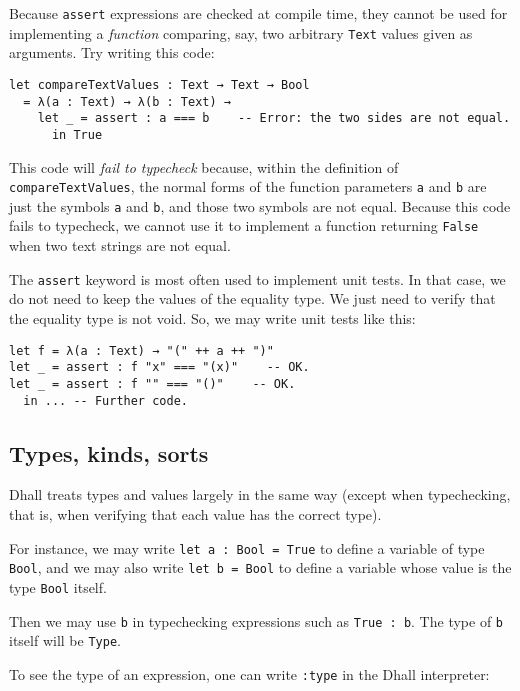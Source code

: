 Because \lstinline!assert! expressions are checked at compile time, they cannot be used for implementing a \emph{function} comparing, say, two arbitrary \lstinline!Text! values given as arguments.
Try writing this code:


\begin{lstlisting}[language=Dhall]
let compareTextValues : Text → Text → Bool
  = λ(a : Text) → λ(b : Text) → 
    let _ = assert : a === b    -- Error: the two sides are not equal.
      in True
\end{lstlisting}


This code will \emph{fail to typecheck} because, within the definition of \lstinline!compareTextValues!, the normal forms of the function parameters \lstinline!a! and \lstinline!b! are just the symbols \lstinline!a! and \lstinline!b!, and those two symbols are not equal.
Because this code fails to typecheck, we cannot use it to implement a function returning \lstinline!False! when two text strings are not equal.


The \lstinline!assert! keyword is most often used to implement unit tests.
In that case, we do not need to keep the values of the equality type.
We just need to verify that the equality type is not void.
So, we may write unit tests like this:


\begin{lstlisting}[language=Dhall]
let f = λ(a : Text) → "(" ++ a ++ ")"
let _ = assert : f "x" === "(x)"    -- OK.
let _ = assert : f "" === "()"    -- OK.
  in ... -- Further code.
\end{lstlisting}


\subsection{Types, kinds, sorts}


Dhall treats types and values largely in the same way (except when typechecking, that is, when verifying that each value has the correct type).


For instance, we may write \lstinline!let a : Bool = True! to define a variable of type \lstinline!Bool!, and we may also write \lstinline!let b = Bool! to define a variable whose value is the type \lstinline!Bool! itself.


Then we may use \lstinline!b! in typechecking expressions such as \lstinline!True : b!.
The type of \lstinline!b! itself will be \lstinline!Type!.


To see the type of an expression, one can write \lstinline!:type! in the Dhall interpreter:



